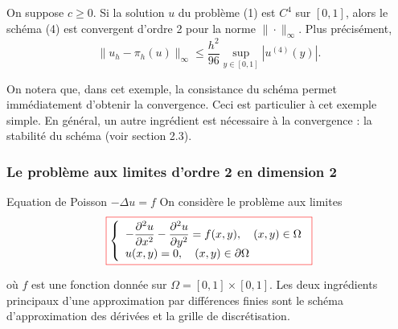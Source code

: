 \documentclass{beamer}
\newcommand{\myredbox}[1]{\fcolorbox{red}{white}{$\displaystyle#1$}}
\begin{document}
   \begin{frame} 
   \begin{theorem}
 On suppose $c \geqslant 0$. Si la solution $u$ du problème (1) est $C^4$ sur $[0, 1]$, alors le schéma (4) est convergent d'ordre 2 pour la norme $\|\cdot \|_{\infty}$. Plus précisément,
\[\|u_h -\pi_h(u)\|_{\infty} \leqslant \frac{h^2}{96}  \sup_{y\in[0,1]} |u^{(4)}(y)|.\]
 \end{theorem}
 
 
 
On notera que, dans cet exemple, la consistance du schéma permet immédiatement d'obtenir la convergence. Ceci est particulier à cet exemple simple. En général, un autre ingrédient est nécessaire à la convergence : la stabilité du schéma (voir section 2.3).


\end{frame}

\begin{frame}
\frametitle{Le problème aux limites d'ordre 2 en dimension 2}
Equation de Poisson $-\Delta u =f$
On considère le problème aux limites
\begin{equation}
\myredbox{\left\{\begin{array}{l}
{\displaystyle -\frac{\partial ^2 u}{\partial  x^2}-\frac{\partial ^2 u}{\partial  y^2} }=f(x,y), \quad(x,y)\in \Omega\\
u(x,y)=0,\quad (x,y)\in \partial\Omega
\end{array}\right.}
\end{equation}
 
où $f$ est une  fonction donnée sur $\Omega = [0, 1]\times [0, 1]$.
Les deux ingrédients principaux d'une approximation par différences finies sont le schéma d'approximation des dérivées et la grille de discrétisation.
 \end{frame}
 
\end{document}
